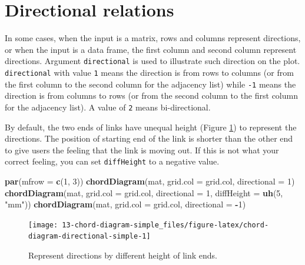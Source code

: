 \documentclass[]{book}
\newenvironment{Shaded}{\begin{snugshade}}{\end{snugshade}}
\newcommand{\KeywordTok}[1]{\textcolor[rgb]{0.13,0.29,0.53}{\textbf{#1}}}
\newcommand{\DataTypeTok}[1]{\textcolor[rgb]{0.13,0.29,0.53}{#1}}
\newcommand{\DecValTok}[1]{\textcolor[rgb]{0.00,0.00,0.81}{#1}}
\newcommand{\StringTok}[1]{\textcolor[rgb]{0.31,0.60,0.02}{#1}}
\newcommand{\OperatorTok}[1]{\textcolor[rgb]{0.81,0.36,0.00}{\textbf{#1}}}
\newcommand{\NormalTok}[1]{#1}
\theoremstyle{definition}
\theoremstyle{definition}
\theoremstyle{remark}
\begin{document}
\section{Directional relations}\label{directional-relations}

In some cases, when the input is a matrix, rows and columns represent
directions, or when the input is a data frame, the first column and
second column represent directions. Argument \texttt{directional} is
used to illustrate such direction on the plot. \texttt{directional} with
value \texttt{1} means the direction is from rows to columns (or from
the first column to the second column for the adjacency list) while
\texttt{-1} means the direction is from columns to rows (or from the
second column to the first column for the adjacency list). A value of
\texttt{2} means bi-directional.

By default, the two ends of links have unequal height (Figure
\ref{fig:chord-diagram-directional-simple}) to represent the directions.
The position of starting end of the link is shorter than the other end
to give users the feeling that the link is moving out. If this is not
what your correct feeling, you can set \texttt{diffHeight} to a negative
value.

\begin{Shaded}
\begin{Highlighting}[]
\KeywordTok{par}\NormalTok{(}\DataTypeTok{mfrow =} \KeywordTok{c}\NormalTok{(}\DecValTok{1}\NormalTok{, }\DecValTok{3}\NormalTok{))}
\KeywordTok{chordDiagram}\NormalTok{(mat, }\DataTypeTok{grid.col =}\NormalTok{ grid.col, }\DataTypeTok{directional =} \DecValTok{1}\NormalTok{)}
\KeywordTok{chordDiagram}\NormalTok{(mat, }\DataTypeTok{grid.col =}\NormalTok{ grid.col, }\DataTypeTok{directional =} \DecValTok{1}\NormalTok{, }\DataTypeTok{diffHeight =} \KeywordTok{uh}\NormalTok{(}\DecValTok{5}\NormalTok{, }\StringTok{"mm"}\NormalTok{))}
\KeywordTok{chordDiagram}\NormalTok{(mat, }\DataTypeTok{grid.col =}\NormalTok{ grid.col, }\DataTypeTok{directional =} \OperatorTok{-}\DecValTok{1}\NormalTok{)}
\end{Highlighting}
\end{Shaded}

\begin{figure}

{\centering \texttt{[image: 13-chord-diagram-simple\_files/figure-latex/chord-diagram-directional-simple-1]} 

}

\caption{Represent directions by different height of link ends.}\label{fig:chord-diagram-directional-simple}
\end{figure}
\end{document}
